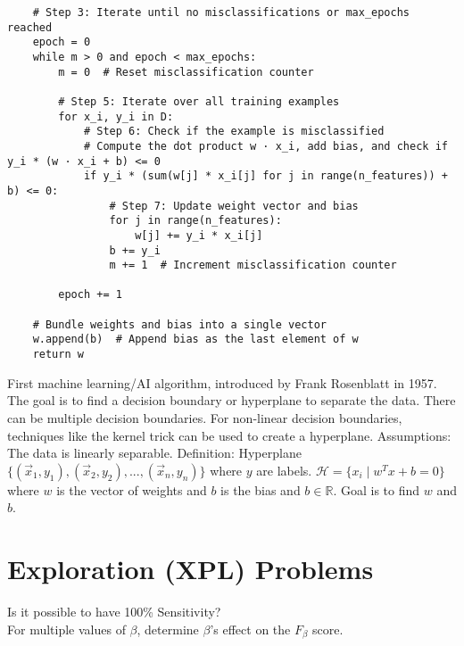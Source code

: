 \begin{outline}
\begin{verbatim}
    # Step 3: Iterate until no misclassifications or max_epochs reached
    epoch = 0
    while m > 0 and epoch < max_epochs:
        m = 0  # Reset misclassification counter
        
        # Step 5: Iterate over all training examples
        for x_i, y_i in D:
            # Step 6: Check if the example is misclassified
            # Compute the dot product w · x_i, add bias, and check if y_i * (w · x_i + b) <= 0
            if y_i * (sum(w[j] * x_i[j] for j in range(n_features)) + b) <= 0:
                # Step 7: Update weight vector and bias
                for j in range(n_features):
                    w[j] += y_i * x_i[j]
                b += y_i
                m += 1  # Increment misclassification counter
        
        epoch += 1
    
    # Bundle weights and bias into a single vector
    w.append(b)  # Append bias as the last element of w
    return w
\end{verbatim}
    
\end{outline}


\begin{outline}
    \1 First machine learning/AI algorithm, introduced by Frank Rosenblatt in 1957.
    \1 The goal is to find a decision boundary or hyperplane to separate the data. There can be multiple decision boundaries.
    \1 For non-linear decision boundaries, techniques like the kernel trick can be used to create a hyperplane.
    \1 Assumptions:
        \2 The data is linearly separable.
    \1 Definition: Hyperplane
        \2 $\{(\vec{x}_1,y_1),(\vec{x}_2,y_2),...,(\vec{x}_n,y_n)\}$ where $y$ are labels.
        \2 $\mathcal{H}=\{x_i\mid w^Tx+b=0\}$ where $w$ is the vector of weights and $b$ is the bias and $b\in\mathbb{R}$.
        \2 Goal is to find $w$ and $b$.
\end{outline}

\section{Exploration (XPL) Problems}
\begin{outline}[enumerate]

    \1  Is it possible to have 100\% Sensitivity? \\
    \1  For multiple values of $\beta$, determine $\beta$'s effect on the $F_\beta$ score.\\

\end{outline}